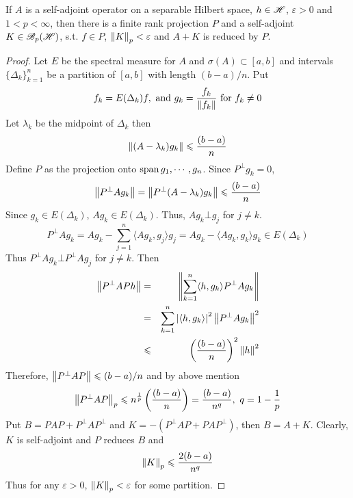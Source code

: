 \documentclass[a4paper,11pt]{report}
\begin{document}
\begin{lem}
	If $A$ is a self-adjoint operator on a separable Hilbert space, $h \in \mathscr{H}$, $\varepsilon > 0$ and $1 < p < \infty$, then there is a finite rank projection $P$ and a self-adjoint $K \in \mathscr{B}_p(\mathscr{H})$, s.t. $f \in P$, $\left\lVert K\right\lVert_p < \varepsilon$ and $A+K$ is reduced by $P$.
\end{lem}
\begin{proof}
	Let $E$ be the spectral measure for $A$ and $\sigma(A) \subset [a,b]$ and intervals $\{\Delta_k\}_{k=1}^{n}$ be a partition of $[a,b]$ with length $(b-a)/n$. Put
	\begin{equation*}
		f_k = E(\Delta_k) f, \text{ and } g_k = \frac{f_k}{\left\lVert f_k\right\lVert} \text{ for } f_k \neq 0
	\end{equation*}
	Let $\lambda_k$ be the midpoint of $\Delta_k$ then
	\begin{equation*}
		\left\lVert(A-\lambda_k)g_k\right\lVert \leqslant \frac{(b-a)}{n}
	\end{equation*}
	Define $P$ as the projection onto $\operatorname{span}{g_1,\cdots,g_n}$. Since $P^{\bot}g_k = 0$,
	\begin{equation*}
		\left\lVert P^{\bot} Ag_k\right\lVert = \left\lVert P^{\bot}(A-\lambda_k)g_k\right\lVert \leqslant \frac{(b-a)}{n}
	\end{equation*}
	Since $g_k \in E(\Delta_k)$, $Ag_k \in E(\Delta_k)$. Thus, $Ag_k \bot g_j$ for $j \neq k$.
	\begin{equation*}
		P^{\bot} Ag_k = Ag_k - \sum_{j=1}^{n} \langle Ag_k,g_j \rangle g_j = Ag_k - \langle Ag_k,g_k \rangle g_k \in E(\Delta_k)
	\end{equation*}
	Thus $P^{\bot}Ag_k \bot P^{\bot}Ag_j$ for $j \neq k$. Then
	\begin{eqnarray*}
		\left\lVert P^{\bot}APh\right\lVert &=& \left\lVert\sum_{k=1}^n \langle h,g_k \rangle P^{\bot}Ag_k\right\lVert \\
		&=& \sum_{k=1}^n \left\lvert\langle h,g_k \rangle\right\lvert^2 \left\lVert P^{\bot}Ag_k\right\lVert^2 \\
		&\leqslant& \left(\frac{(b-a)}{n} \right)^2 \left\lVert h\right\lVert^2
	\end{eqnarray*}
	Therefore, $\left\lVert P^{\bot}AP\right\lVert \leqslant {(b-a)}/{n}$ and by above mention
	\begin{equation*}
		\left\lVert P^{\bot}AP\right\lVert_p \leqslant n^{\frac{1}{p}} \left(\frac{(b-a)}{n} \right) = \frac{(b-a)}{n^q},~ q = 1 - \frac{1}{p}
	\end{equation*}
	Put $B = PAP + P^{\bot}AP^{\bot}$ and $K = -(P^{\bot}AP + PAP^{\bot})$, then $B = A + K$. Clearly, $K$ is self-adjoint and $P$ reduces $B$ and 
	\begin{equation*}
		\left\lVert K\right\lVert_p \leqslant \frac{2(b-a)}{n^q}
 	\end{equation*}
 	Thus for any $\varepsilon > 0$, $\left\lVert K\right\lVert_p < \varepsilon$ for some partition.
\end{proof}
\end{document}
